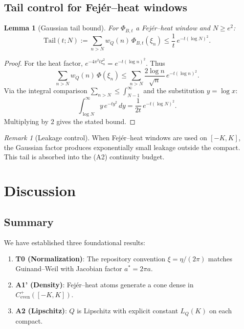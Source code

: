\documentclass[11pt,a4paper]{article}
\newtheorem{lemma}[theorem]{Lemma}
\theoremstyle{definition}
\theoremstyle{remark}
\newtheorem{remark}[theorem]{Remark}
\begin{document}
\subsection{Tail control for Fej\'er--heat windows}

\begin{lemma}[Gaussian tail bound]\label{lem:tail}
For $\Phi_{B,t}$ a Fej\'er--heat window and $N \geq e^2$:
\[
  \mathrm{Tail}(t; N) := \sum_{n > N} w_Q(n)\, \Phi_{B,t}(\xi_n) \leq \frac{1}{t}\, e^{-t(\log N)^2}.
\]
\end{lemma}

\begin{proof}
For the heat factor, $e^{-4\pi^2 t \xi_n^2} = e^{-t(\log n)^2}$. Thus
\[
  \sum_{n > N} w_Q(n)\, \Phi(\xi_n) \leq \sum_{n > N} \frac{2\log n}{\sqrt{n}}\, e^{-t(\log n)^2}.
\]
Via the integral comparison $\sum_{n > N} \leq \int_{N-1}^\infty$ and the substitution $y = \log x$:
\[
  \int_{\log N}^\infty y\, e^{-ty^2}\, dy = \frac{1}{2t}\, e^{-t(\log N)^2}.
\]
Multiplying by $2$ gives the stated bound.
\end{proof}

\begin{remark}[Leakage control]
When Fej\'er--heat windows are used on $[-K, K]$, the Gaussian factor produces exponentially small leakage outside the compact. This tail is absorbed into the (A2) continuity budget.
\end{remark}

\section{Discussion}

\subsection{Summary}

We have established three foundational results:
\begin{enumerate}
  \item \textbf{T0 (Normalization)}: The repository convention $\xi = \eta/(2\pi)$ matches Guinand--Weil with Jacobian factor $a^* = 2\pi a$.
  \item \textbf{A1' (Density)}: Fej\'er--heat atoms generate a cone dense in $C^+_{\mathrm{even}}([-K,K])$.
  \item \textbf{A2 (Lipschitz)}: $Q$ is Lipschitz with explicit constant $L_Q(K)$ on each compact.
\end{enumerate}
\end{document}
